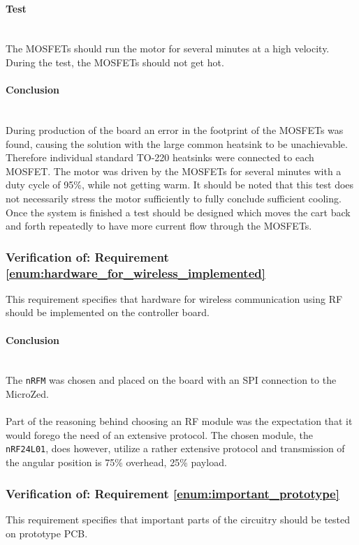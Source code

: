 \paragraph{Test}~\\
The MOSFETs should run the motor for several minutes at a high velocity. 
During the test, the MOSFETs should not get hot.

\paragraph{Conclusion}~\\
During production of the board an error in the footprint of the MOSFETs was found, causing the solution with the large common heatsink to be unachievable.
Therefore individual standard TO-220 heatsinks were connected to each MOSFET.
The motor was driven by the MOSFETs for several minutes with a duty cycle of 95\%, while not getting warm.
It should be noted that this test does not necessarily stress the motor sufficiently to fully conclude sufficient cooling.
Once the system is finished a test should be designed which moves the cart back and  forth repeatedly to have more current flow through the MOSFETs.

\subsubsection{Verification of: Requirement \ref{enum:hardware_for_wireless_implemented}} %
\label{ssub:requirement_enum:hardware_for_wireless_implemented}
This requirement specifies that hardware for wireless communication using RF should be implemented on the controller board.

\paragraph{Conclusion}~\\
The \texttt{nRFM} was chosen and placed on the board with an SPI connection to the MicroZed.
\\~\\
Part of the reasoning behind choosing an RF module was the expectation that it would forego the need of an extensive protocol.
The chosen module, the \texttt{nRF24L01}, does however, utilize a rather extensive protocol and transmission of the angular position is 75\% overhead, 25\% payload.

\subsubsection{Verification of: Requirement \ref{enum:important_prototype}} %
\label{ssub:requirement_enum:important_prototype}
This requirement specifies that important parts of the circuitry should be tested on prototype PCB.

